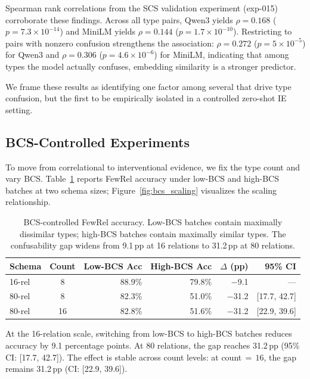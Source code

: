 Spearman rank correlations from the SCS validation experiment (exp-015) corroborate these findings. Across all type pairs, Qwen3 yields $\rho = 0.168$ ($p = 7.3 \times 10^{-14}$) and MiniLM yields $\rho = 0.144$ ($p = 1.7 \times 10^{-10}$). Restricting to pairs with nonzero confusion strengthens the association: $\rho = 0.272$ ($p = 5 \times 10^{-5}$) for Qwen3 and $\rho = 0.306$ ($p = 4.6 \times 10^{-6}$) for MiniLM, indicating that among types the model actually confuses, embedding similarity is a stronger predictor.

We frame these results as identifying one factor among several that drive type confusion, but the first to be empirically isolated in a controlled zero-shot IE setting.

\subsection{BCS-Controlled Experiments}
\label{sec:bcs_controlled}

To move from correlational to interventional evidence, we fix the type count and vary BCS. Table~\ref{tab:bcs_controlled} reports FewRel accuracy under low-BCS and high-BCS batches at two schema sizes; Figure~\ref{fig:bcs_scaling} visualizes the scaling relationship.

\begin{table}[t]
\centering
\small
\begin{tabular}{lcrrrr}
\toprule
\textbf{Schema} & \textbf{Count} & \textbf{Low-BCS Acc} & \textbf{High-BCS Acc} & \textbf{$\Delta$ (pp)} & \textbf{95\% CI} \\
\midrule
16-rel & 8 & 88.9\% & 79.8\% & $-$9.1 & --- \\
80-rel & 8 & 82.3\% & 51.0\% & $-$31.2 & {[}17.7, 42.7{]} \\
80-rel & 16 & 82.8\% & 51.6\% & $-$31.2 & {[}22.9, 39.6{]} \\
\bottomrule
\end{tabular}
\caption{BCS-controlled FewRel accuracy. Low-BCS batches contain maximally dissimilar types; high-BCS batches contain maximally similar types. The confusability gap widens from 9.1\,pp at 16 relations to 31.2\,pp at 80 relations.}
\label{tab:bcs_controlled}
\end{table}

At the 16-relation scale, switching from low-BCS to high-BCS batches reduces accuracy by 9.1 percentage points. At 80 relations, the gap reaches 31.2\,pp (95\% CI: [17.7, 42.7]). The effect is stable across count levels: at count${}\,=\,16$, the gap remains 31.2\,pp (CI: [22.9, 39.6]).

